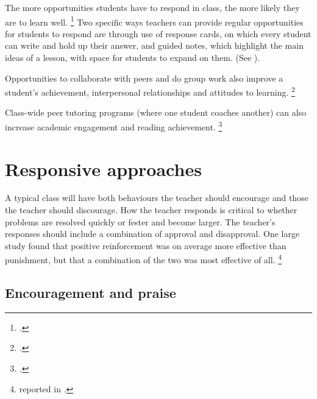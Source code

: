 \documentclass[FrontPage]{grattan}
\begin{document}
\citetrackerfalse

The more opportunities students have to respond in class, the more likely they are to learn well.%
    \footcite{Simonsen2008EvidenceBasedPractices} 
Two specific ways teachers can provide regular opportunities for students to respond are through use of response cards, on which every student can write and hold up their answer, and guided notes, which highlight the main ideas of a lesson, with space for students to expand on them. (See ).
 
Opportunities to collaborate with peers and do group work also improve a student's achievement, interpersonal relationships and attitudes to learning.%
    \footcite{Marzano2003ClassroomManagementWorks}
 
Class-wide peer tutoring programs (where one student coaches another) can also increase academic engagement and reading achievement.%
    \footcite{Simonsen2008EvidenceBasedPractices}
 
\citetrackertrue

\section{Responsive approaches}\label{sec:responsive-approaches}
A typical class will have both behaviours the teacher should encourage and those the teacher should discourage. How the teacher responds is critical to whether problems are resolved quickly or fester and become larger. 
The teacher's responses should include a combination of approval and disapproval. One large study found that positive reinforcement was on average more effective than punishment, but that a combination of the two was most effective of all.%
    \footnote{\textcite{Stage1997MetaanalysisInterventionsDecrease} reported in \textcite{Marzano2003ClassroomManagementWorks}.}

\subsection{Encouragement and praise}\label{subsec:encouragement-and-praise}
\end{document}
